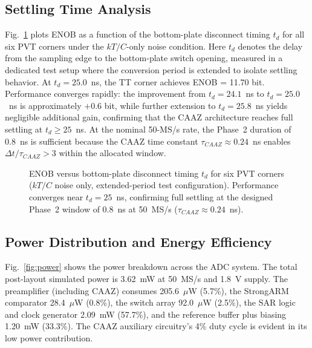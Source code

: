 \documentclass[journal]{IEEEtran}
\begin{document}
\subsection{Settling Time Analysis}

Fig.~\ref{fig:settling} plots ENOB as a function of the bottom-plate disconnect timing $t_d$ for all six PVT corners under the $kT/C$-only noise condition. Here $t_d$ denotes the delay from the sampling edge to the bottom-plate switch opening, measured in a dedicated test setup where the conversion period is extended to isolate settling behavior. At $t_d = 25.0$~ns, the TT corner achieves ENOB = 11.70 bit. Performance converges rapidly: the improvement from $t_d = 24.1$~ns to $t_d = 25.0$~ns is approximately $+0.6$ bit, while further extension to $t_d = 25.8$~ns yields negligible additional gain, confirming that the CAAZ architecture reaches full settling at $t_d \geq 25$~ns. At the nominal 50-MS/s rate, the Phase~2 duration of 0.8~ns is sufficient because the CAAZ time constant $\tau_{CAAZ}\approx 0.24$~ns enables $\Delta t/\tau_{CAAZ} > 3$ within the allocated window.

\begin{figure}[!t]
\centering
{}
\caption{ENOB versus bottom-plate disconnect timing $t_d$ for six PVT corners ($kT/C$ noise only, extended-period test configuration). Performance converges near $t_d = 25$~ns, confirming full settling at the designed Phase~2 window of 0.8~ns at 50~MS/s ($\tau_{CAAZ}\approx 0.24$~ns).}
\label{fig:settling}
\end{figure}

\subsection{Power Distribution and Energy Efficiency}

Fig.~\ref{fig:power} shows the power breakdown across the ADC system. The total post-layout simulated power is 3.62~mW at 50~MS/s and 1.8~V supply. The preamplifier (including CAAZ) consumes 205.6~$\mu$W (5.7\%), the StrongARM comparator 28.4~$\mu$W (0.8\%), the switch array 92.0~$\mu$W (2.5\%), the SAR logic and clock generator 2.09~mW (57.7\%), and the reference buffer plus biasing 1.20~mW (33.3\%). The CAAZ auxiliary circuitry's 4\% duty cycle is evident in its low power contribution.
\end{document}
